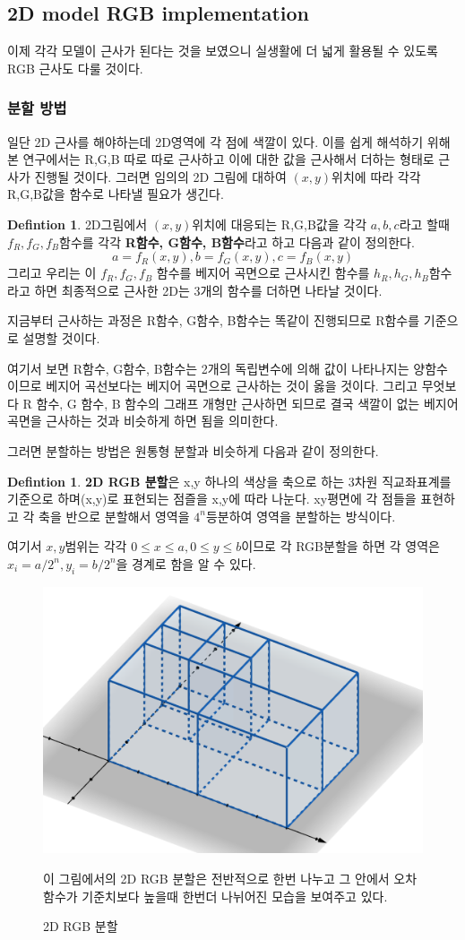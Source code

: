 \documentclass{gshs_thesis}
\theoremstyle{theorem}
\theoremstyle{lemma}
\theoremstyle{definition}
\newtheorem{definition}[theorem]{Defintion}
\begin{document}
\subsection{2D model RGB implementation}
이제 각각 모델이 근사가 된다는 것을 보였으니 실생활에 더 넓게 활용될 수 있도록 RGB 근사도 다룰 것이다.
\subsubsection{분할 방법}
일단 2D 근사를 해야하는데 2D영역에 각 점에 색깔이 있다. 이를 쉽게 해석하기 위해 본 연구에서는 R,G,B 따로 따로 근사하고 이에 대한 값을 근사해서 더하는 형태로 근사가 진행될 것이다. 그러면 임의의 2D 그림에 대하여 $(x,y)$위치에 따라 각각 R,G,B값을 함수로 나타낼 필요가 생긴다.
\begin{definition}
{
  2D그림에서 $(x,y)$위치에 대응되는 R,G,B값을 각각  $a,b,c$라고 할때 $f_{R},f_{G},f_{B}$함수를 각각 \textbf{R함수, G함수, B함수}라고 하고 다음과 같이 정의한다.
  \begin{equation}
  	a=f_{R}(x,y), b=f_{G}(x,y), c=f_{B}(x,y)
  \end{equation}
  그리고 우리는 이 $f_{R},f_{G},f_{B}$ 함수를 베지어 곡면으로 근사시킨 함수를 $h_{R},h_{G},h_{B}$함수라고 하면 최종적으로 근사한 2D는 3개의 함수를 더하면 나타날 것이다.
}
\end{definition}
지금부터 근사하는 과정은 R함수, G함수, B함수는 똑같이 진행되므로 R함수를 기준으로 설명할 것이다.

여기서 보면 R함수, G함수, B함수는 2개의 독립변수에 의해 값이 나타나지는 양함수이므로 베지어 곡선보다는 베지어 곡면으로 근사하는 것이 옳을 것이다. 그리고 무엇보다 R 함수, G 함수, B 함수의 그래프 개형만 근사하면 되므로 결국 색깔이 없는 베지어 곡면을 근사하는 것과 비슷하게 하면 됨을 의미한다.

그러면 분할하는 방법은 원통형 분할과 비슷하게 다음과 같이 정의한다.
\begin{definition}
	\textbf{2D RGB 분할}은 x,y 하나의 색상을 축으로 하는 3차원 직교좌표계를 기준으로 하며(x,y)로 표현되는 점즐을 x,y에 따라 나눈다. xy평면에 각 점들을 표현하고 각 축을 반으로 분할해서 영역을 $4^{n}$등분하여 영역을 분할하는 방식이다. 
	
	여기서 $x,y$범위는 각각 $0\leq{x}\leq{a},0\leq{y}\leq{b}$이므로 각 RGB분할을 하면 각 영역은 $x_{i}=a/2^{n},y_{i}=b/2^{n}$을 경계로 함을 알 수 있다.
\end{definition}
\begin{figure}[h]
	\centering
	\includegraphics[width=.5\textwidth]{image/RGB2Ddivision}
	\caption{2D RGB 분할}
	\small \raggedright 이 그림에서의 2D RGB 분할은 전반적으로 한번 나누고 그 안에서 오차함수가 기준치보다 높을때 한번더 나뉘어진 모습을 보여주고 있다. 
\end{figure}
\end{document}
